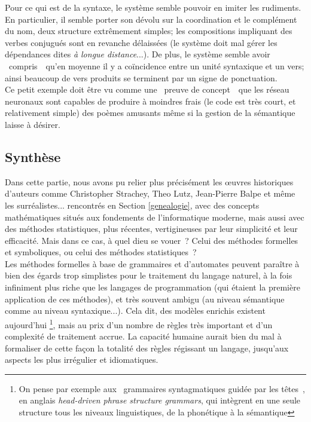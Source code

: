 \documentclass{article}
\begin{document}
					Pour ce qui est de la syntaxe, le système semble pouvoir en imiter les rudiments. En particulier, il semble porter son dévolu sur la coordination et le complément du nom, deux structure extrêmement simples; les compositions impliquant des verbes conjugués sont en revanche délaissées (le système doit mal gérer les dépendances dites \textit{à longue distance}...). De plus, le système semble avoir \guillemotleft~compris~\guillemotright~qu'en moyenne il y a coïncidence entre un unité syntaxique et un vers; ainsi beaucoup de vers produits se terminent par un signe de ponctuation.\\
					
					Ce petit exemple doit être vu comme une \guillemotleft~preuve de concept~\guillemotright~que les réseau neuronaux sont capables de produire à moindres frais (le code est très court, et relativement simple) des poèmes amusants même si la gestion de la sémantique laisse à désirer.
					
		\subsection{Synthèse}
			Dans cette partie, nous avons pu relier plus précisément les œuvres historiques d'auteurs comme Christopher Strachey, Theo Lutz, Jean-Pierre Balpe et même les surréalistes... rencontrés en Section \ref{genealogie}, avec des concepts mathématiques situés aux fondements de l'informatique moderne, mais aussi avec des méthodes statistiques, plus récentes, vertigineuses par leur simplicité et leur efficacité. Mais dans ce cas, à quel dieu se vouer~? Celui des méthodes formelles et symboliques, ou celui des méthodes statistiques~?\\
				
			Les méthodes formelles à base de grammaires et d'automates peuvent paraître à bien des égards trop simplistes pour le traitement du langage naturel, à la fois infiniment plus riche que les langages de programmation (qui étaient la première application de ces méthodes), et très souvent ambigu (au niveau sémantique comme au niveau syntaxique...). Cela dit, des modèles enrichis existent aujourd'hui \footnote{On pense par exemple aux \guillemotleft~grammaires syntagmatiques guidée par les têtes~\guillemotright, en anglais \textit{head-driven phrase structure grammars}, qui intègrent en une seule structure tous les niveaux linguistiques, de la phonétique à la sémantique}, mais au prix d'un nombre de règles très important et d'un complexité de traitement accrue. La capacité humaine aurait bien du mal à formaliser de cette façon la totalité des règles régissant un langage, jusqu'aux aspects les plus irrégulier et idiomatiques.
			
\end{document}
